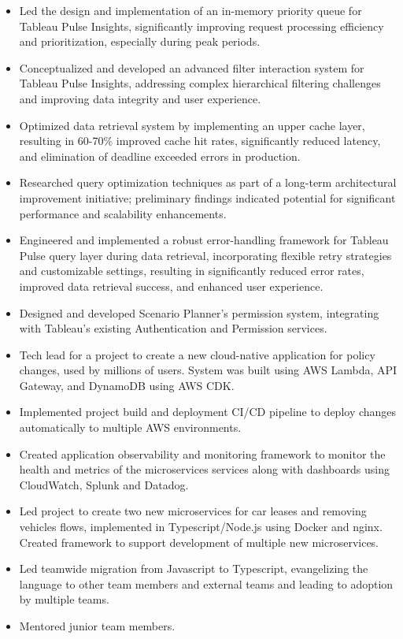 \documentclass[11pt,a4paper,sans]{moderncv}
\begin{document}
{ \begin{itemize} \itemsep 2pt
  \item Led the design and implementation of an in-memory priority queue for Tableau Pulse Insights, significantly improving request processing efficiency and prioritization, especially during peak periods.
  \item Conceptualized and developed an advanced filter interaction system for Tableau Pulse Insights, addressing complex hierarchical filtering challenges and improving data integrity and user experience.
  \item Optimized data retrieval system by implementing an upper cache layer, resulting in 60-70\% improved cache hit rates, significantly reduced latency, and elimination of deadline exceeded errors in production.
  \item Researched query optimization techniques as part of a long-term architectural improvement initiative; preliminary findings indicated potential for significant performance and scalability enhancements.
  \item Engineered and implemented a robust error-handling framework for Tableau Pulse query layer during data retrieval, incorporating flexible retry strategies and customizable settings, resulting in significantly reduced error rates, improved data retrieval success, and enhanced user experience.
  \item Designed and developed Scenario Planner's permission system, integrating with Tableau's existing Authentication and Permission services.
 \end{itemize} }

{ \begin{itemize} \itemsep -1pt
  \item Tech lead for a project to create a new cloud-native application for policy changes, used by millions of users. System was built using AWS Lambda, API Gateway, and DynamoDB using AWS CDK.
  \item Implemented project build and deployment CI/CD pipeline to deploy changes automatically to multiple AWS environments.
  \item Created application observability and monitoring framework to monitor the health and metrics of the microservices services along with dashboards using CloudWatch, Splunk and Datadog.
  \item Led project to create two new microservices for car leases and removing vehicles flows, implemented in Typescript/Node.js using Docker and nginx. Created framework to support development of multiple new microservices.
  \item Led teamwide migration from Javascript to Typescript, evangelizing the language to other team members and external teams and leading to adoption by multiple teams.
  \item Mentored junior team members.
 \end{itemize} }
\end{document}
